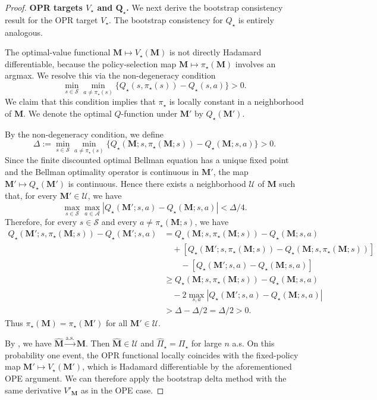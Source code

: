 \documentclass{article}
\numberwithin{equation}{section}
\newcommand{\Q}{\boldsymbol{Q}}
\begin{document}
\begin{proof}
\medskip\noindent\textbf{OPR targets $V_\star$ and $\Q_\star$.}
We next derive the bootstrap consistency result for the OPR target $V_\star$.
The bootstrap consistency for $Q_\star$ is entirely analogous.

The optimal-value functional $\mathbf{M}\mapsto V_\star(\mathbf{M})$ is not directly Hadamard differentiable, because the policy-selection map $\mathbf{M}\mapsto\pi_\star(\mathbf{M})$ involves an argmax.
We resolve this via the non-degeneracy condition
\[
\min_{s\in\mathcal{S}} \min_{a \neq \pi_\star(s)}\bigl\{Q_\star(s, \pi_\star(s))-Q_\star(s,a)\bigr\}>0.
\]
We claim that this condition implies that $\pi_\star$ is locally constant in a neighborhood of $\mathbf{M}$.
We denote the optimal $Q$-function under $\mathbf{M'}$ by $Q_\star(\mathbf{M'})$.

By the non-degeneracy condition, we define
\[
\Delta
:=
\min_{s\in\mathcal S}
\min_{a\neq \pi_\star(s)}
\{Q_\star(\mathbf{M};s,\pi_\star(\mathbf{M}; s))-Q_\star(\mathbf{M};s,a)\}
>0.
\]
Since the finite discounted optimal Bellman equation has a unique fixed point and the
Bellman optimality operator is continuous in \(\mathbf{M'}\), the map
\(\mathbf{M'}\mapsto Q_\star(\mathbf{M'})\) is continuous. 
Hence there exists a neighborhood
\(\mathcal U\) of \(\mathbf{M}\) such that, for every \(\mathbf{M'}\in\mathcal U\), we have
\[
\max_{s\in\mathcal S}\max_{a\in\mathcal A}
|Q_\star(\mathbf{M'};s,a)-Q_\star(\mathbf{M};s,a)|
< \Delta/4 .
\]
Therefore, for every \(s\in\mathcal S\) and every \(a\neq \pi_\star(\mathbf{M};s)\), we have
\[
\begin{aligned}
Q_\star(\mathbf{M'};s,\pi_\star(\mathbf{M};s))-Q_\star(\mathbf{M'};s,a)
&= Q_\star(\mathbf{M};s,\pi_\star(\mathbf{M};s)) - Q_\star(\mathbf{M};s,a) \\
&\quad+ \left[Q_\star(\mathbf{M'};s,\pi_\star(\mathbf{M};s)) - Q_\star(\mathbf{M};s,\pi_\star(\mathbf{M};s))\right] \\
& \quad \quad - \left[Q_\star(\mathbf{M'};s,a)-Q_\star(\mathbf{M};s,a)\right]
\\
&\ge
Q_\star(\mathbf{M};s,\pi_\star(\mathbf{M};s))-Q_\star(\mathbf{M};s,a)
\\
&\quad
-2\max_{s,a}|Q_\star(\mathbf{M'};s,a)-Q_\star(\mathbf{M};s,a)|
\\
&> \Delta-\Delta/2
= \Delta/2>0.
\end{aligned}
\]
Thus \(\pi_\star(\mathbf{M}) = \pi_\star(\mathbf{M'})\) for all $\mathbf{M'} \in \mathcal U$. 

By \citet[Lemma 1]{su2025centrallimittheoremstransition}, we have $\hat{\mathbf{M}}\xrightarrow{\mathrm{a.s.}}\mathbf{M}$. 
Then $\hat{\mathbf{M}}\in\mathcal{U}$ and $\hat\Pi_\star=\Pi_\star$ for large $n$ a.s.
On this probability one event, the OPR functional locally coincides with the fixed-policy map $\mathbf{M}'\mapsto V_\star(\mathbf{M}')$,
which is Hadamard differentiable by the aforementioned OPE argument.
We can therefore apply the bootstrap delta method with the same derivative $V'_\mathbf{M}$ as in the OPE case.


\end{proof}
\end{document}
